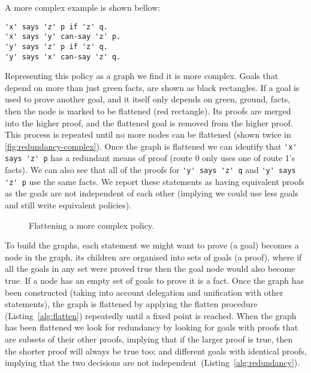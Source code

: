 \documentclass[a4paper]{scrartcl}
\begin{document}
A more complex example is shown bellow:
\begin{lstlisting}
'x' says 'z' p if 'z' q.
'x' says 'y' can-say 'z' p.
'y' says 'z' p if 'z' q.
'y' says 'x' can-say 'z' q.
\end{lstlisting}
Representing this policy as a graph we find it is more complex. Goals that
depend on more than just green facts, are shown as black rectangles.  If a goal
is used to prove another goal, and it itself only depends on green, ground,
facts, then the node is marked to be flattened (red rectangle).  Its proofs are
merged into the higher proof, and the flattened goal is removed from the higher
proof.  This process is repeated until no more nodes can be flattened (shown
twice in \autoref{fig:redundancy-complex}).  Once the graph is flattened we can
identify that \lstinline!'x' says 'z' p! has a redundant means of proof (route
0 only uses one of route 1's facts).  We can also see that all of the proofs for 
\lstinline!'y' says 'z' q! and \lstinline!'y' says 'z' p! use the same facts.
We report these statements as having equivalent proofs as the goals are not
independent of each other (implying we could use less goals and still write
equivalent policies).
\begin{figure}
  \centering\tiny
  \caption{Flattening a more complex policy.}
  \label{fig:redundancy-complex}
\end{figure}

To build the graphs, each statement we might want to prove (a goal) becomes a
node in the graph, its children are organised into sets of goals (a proof),
where if all the goals in any set were proved true then the goal node would also
become true. If a node has an empty set of goals to prove it is a fact. Once the
graph has been constructed (taking into account delegation and unification with
other statements), the graph is flattened by applying the flatten procedure
(Listing~\ref{alg:flatten}) repeatedly until a fixed point is reached. When the
graph has been flattened we look for redundancy by looking for goals with proofs
that are subsets of their other proofs, implying that if the larger proof is
true, then the shorter proof will always be true too; and different goals with
identical proofs, implying that the two decisions are not
independent~(Listing~\ref{alg:redundancy}).
\end{document}
